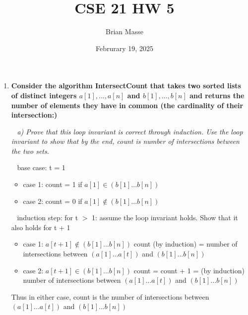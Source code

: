 \documentclass[12pt, letterpaper]{article}
\title{CSE 21 HW 5}
\author{Brian Masse}
\date{Februrary 19, 2025}
\begin{document}
\maketitle
\newpage

\begin{enumerate}

    \item
    \bf{Consider the algorithm IntersectCount that takes two sorted lists of distinct
    integers $a[1],\dots,a[n]$ and $b[1],\dots,b[n]$ and returns the number of
    elements they have in common (the cardinality of their intersection:)}

    \-\ \newline
    \it{ a) Prove that this loop invariant is correct through induction. Use the loop invariant to show that by the end, count is number of intersections between the two sets. }

    \-\ \newline
    base case: t = 1

    \begin{itemize}
        \item case 1: count = 1 if \(a[1] \in ( b[1]...b[n] ) \)

        \item case 2: count = 0 if \(a[1] \notin ( b[1]...b[n] ) \)
        
    \end{itemize} 

    \-\ \newline
    induction step: for t \( > \) 1: \textnormal{assume the loop invariant holds. Show that it also holds for t + 1 }

    \begin{itemize}
        \item case 1: \( a[t + 1] \notin (b[1]...b[n])\) 
        \newline \textnormal{ count (by induction) = number of intersections between \((a[1]...a[t])\) and \((b[1]...b[n]) \) }

        \item case 2:  \( a[t + 1] \in (b[1]...b[n])\)
        \newline \textnormal{ count = count + 1 = (by induction) number of intersections between \((a[1]...a[t])\) and \((b[1]...b[n]) \) }
    \end{itemize} 

    \textnormal{Thus in either case, count is the number of intersections between \((a[1]...a[t])\) and \((b[1]...b[n]) \)}


\end{enumerate}
\end{document}
